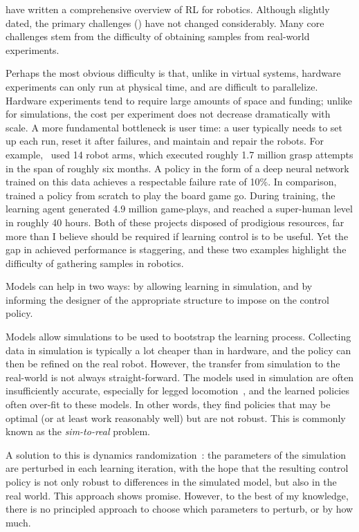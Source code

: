\textcite{kober2013reinforcement} have written a comprehensive overview of RL for robotics. Although slightly dated, the primary challenges (\cite[cf. 8.1 in]{kober2013reinforcement}) have not changed considerably. Many core challenges stem from the difficulty of obtaining samples from real-world experiments. \par
Perhaps the most obvious difficulty is that, unlike in virtual systems, hardware experiments can only run at physical time, and are difficult to parallelize.
Hardware experiments tend to require large amounts of space and funding; unlike for simulations, the cost per experiment does not decrease dramatically with scale.
A more fundamental bottleneck is user time: a user typically needs to set up each run, reset it after failures, and maintain and repair the robots.
For example,~\textcite{levine2018learning} used 14 robot arms, which executed roughly 1.7 million grasp attempts in the span of roughly six months. A policy in the form of a deep neural network trained on this data achieves a respectable failure rate of 10\%.
In comparison,~\textcite{silver2017mastering} trained a policy from scratch to play the board game go. During training, the learning agent generated 4.9 million game-plays, and reached a super-human level in roughly 40 hours.
Both of these projects disposed of prodigious resources, far more than I believe should be required if learning control is to be useful. Yet the gap in achieved performance is staggering, and these two examples highlight the difficulty of gathering samples in robotics. \par
Models can help in two ways: by allowing learning in simulation, and by informing the designer of the appropriate structure to impose on the control policy.
 \par
Models allow simulations to be used to bootstrap the learning process. Collecting data in simulation is typically a lot cheaper than in hardware, and the policy can then be refined on the real robot. However, the transfer from simulation to the real-world is not always straight-forward.
The models used in simulation are often insufficiently accurate, especially for legged locomotion~\cite{neunert2017off,tan2018sim}, and the learned policies often over-fit to these models. In other words, they find policies that may be optimal (or at least work reasonably well) but are not robust. This is commonly known as the \emph{sim-to-real} problem. \par
A solution to this is dynamics randomization~\cite{peng2017sim,lowrey2018reinforcement,tan2018sim}: the parameters of the simulation are perturbed in each learning iteration, with the hope that the resulting control policy is not only robust to differences in the simulated model, but also in the real world. This approach shows promise. However, to the best of my knowledge, there is no principled approach to choose which parameters to perturb, or by how much. \par

